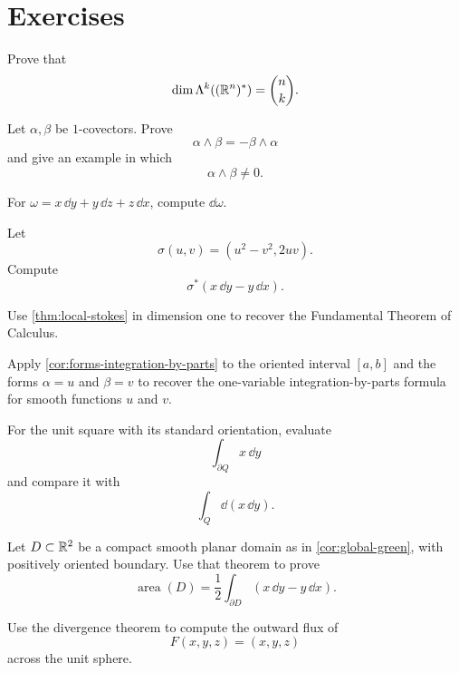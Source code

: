 \section*{Exercises}

\begin{exercise}
Prove that
\[
\dim\Lambda^k((\mathbb{R}^n)^*)=\binom nk.
\]
\end{exercise}

\begin{exercise}
Let $\alpha,\beta$ be $1$-covectors.  Prove
\[
\alpha\wedge\beta=-\beta\wedge\alpha
\]
and give an example in which
\[
\alpha\wedge\beta\ne0.
\]
\end{exercise}

\begin{exercise}
For $\omega=x\,\dd y+y\,\dd z+z\,\dd x$, compute $\dd\omega$.
\end{exercise}

\begin{exercise}
Let
\[
\sigma(u,v)=(u^2-v^2,2uv).
\]
Compute
\[
\sigma^*(x\,\dd y-y\,\dd x).
\]
\end{exercise}

\begin{exercise}
Use \cref{thm:local-stokes} in dimension one to recover the Fundamental
Theorem of Calculus.
\end{exercise}

\begin{exercise}
Apply \cref{cor:forms-integration-by-parts} to the oriented interval
$[a,b]$ and the forms \(\alpha=u\) and \(\beta=v\) to recover the one-variable
integration-by-parts formula for smooth functions \(u\) and \(v\).
\end{exercise}

\begin{exercise}
For the unit square with its standard orientation, evaluate
\[
\int_{\partial Q}x\,\dd y
\]
and compare it with
\[
\int_Q\dd(x\,\dd y).
\]
\end{exercise}

\begin{exercise}
Let $D\subset\mathbb{R}^2$ be a compact smooth planar domain as in
\cref{cor:global-green}, with positively oriented boundary. Use that
theorem to prove
\[
\operatorname{area}(D)=\frac12\int_{\partial D}(x\,\dd y-y\,\dd x).
\]
\end{exercise}

\begin{exercise}
Use the divergence theorem to compute the outward flux of
\[
F(x,y,z)=(x,y,z)
\]
across the unit sphere.
\end{exercise}

